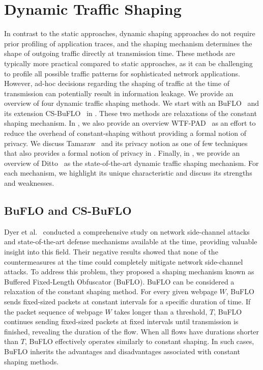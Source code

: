 \section{Dynamic Traffic Shaping}\label{subsec:dynamic-traffic-shaping}
In contrast to the static approaches, dynamic shaping approaches do not require prior profiling of application traces, and the shaping mechanism determines the shape of outgoing traffic directly at transmission time.
These methods are typically more practical compared to static approaches, as it can be challenging to profile all possible traffic patterns for sophisticated network applications.
However, ad-hoc decisions regarding the shaping of traffic at the time of transmission can potentially result in information leakage.
We provide an overview of four dynamic traffic shaping methods.
We start with an BuFLO~\cite{dyer2012peek} and its extension CS-BuFLO~\cite{cai2014csbuflo} in . 
These two methods are relaxations of the constant shaping mechanism.
In , we also provide an overview WTF-PAD~\cite{juarez2016toward} as an effort to reduce the overhead of constant-shaping without providing a formal notion of privacy.
We discuss Tamaraw~\cite{cai2014systematic} and its privacy notion as one of few techniques that also provides a formal notion of privacy in .
Finally, in , we provide an overview of Ditto~\cite{meier2022ditto} as the state-of-the-art dynamic traffic shaping mechanism.  
For each mechanism, we highlight its unique characteristic and discuss its strengths and weaknesses.



\subsection{BuFLO and CS-BuFLO}\label{subsubsec:buflo}
Dyer et al.~\cite{dyer2012peek} conducted a comprehensive study on network side-channel attacks and state-of-the-art defense mechanisms available at the time, providing valuable insight into this field. 
Their negative results showed that none of the countermeasures at the time could completely mitigate network side-channel attacks.
To address this problem, they proposed a shaping mechanism known as Buffered Fixed-Length Obfuscator (BuFLO).
BuFLO can be considered a relaxation of the constant shaping method.
For every given webpage $W$, BuFLO sends fixed-sized packets at constant intervals for a specific duration of time.
If the packet sequence of webpage $W$ takes longer than a threshold, $T$, BuFLO continues sending fixed-sized packets at fixed intervals until transmission is finished, revealing the duration of the flow. 
When all flows have durations shorter than $T$, BuFLO effectively operates similarly to constant shaping.
In such cases, BuFLO inherits the advantages and disadvantages associated with constant shaping methods.~\cite{sirinam2018df}

